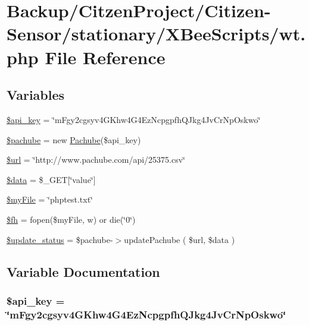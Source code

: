 \hypertarget{wt_8php}{}\section{Backup/\+Citzen\+Project/\+Citizen-\/\+Sensor/stationary/\+X\+Bee\+Scripts/wt.php File Reference}
\label{wt_8php}
\subsection*{Variables}
\begin{DoxyCompactItemize}
\item 
\hyperlink{wt_8php_a186dfe06d14a3bc248c4eb4bcdaec562}{\$api\+\_\+key} = \char`\"{}m\+Fgy2cgsyv4\+G\+Khw4\+G4\+Ez\+Ncpgpfh\+Q\+Jkg4\+Jv\+Cr\+Np\+Oskwo\char`\"{}
\item 
\hyperlink{wt_8php_a9adc98bad34c320e13c5844ae09f3898}{\$pachube} = new \hyperlink{class_pachube}{Pachube}(\$api\+\_\+key)
\item 
\hyperlink{wt_8php_acf215f34a917d014776ce684a9ee8909}{\$url} = \char`\"{}http\+://www.\+pachube.\+com/api/25375.csv\char`\"{}
\item 
\hyperlink{wt_8php_a6efc15b5a2314dd4b5aaa556a375c6d6}{\$data} = \$\+\_\+\+G\+ET\mbox{[}\char`\"{}value\char`\"{}\mbox{]}
\item 
\hyperlink{wt_8php_aec8c77a99462294dbbfb1639bd8b5165}{\$my\+File} = \char`\"{}phptest.\+txt\char`\"{}
\item 
\hyperlink{wt_8php_a015aa0bda28030cbf1a64c0afb88f958}{\$fh} = fopen(\$my\+File, \textquotesingle{}w\textquotesingle{}) or die(\char`\"{}0\char`\"{})
\item 
\hyperlink{wt_8php_ae9e1411ff46e859a40f8f1a7646430cf}{\$update\+\_\+status} = \$pachube-\/$>$update\+Pachube ( \$url, \$data )
\end{DoxyCompactItemize}


\subsection{Variable Documentation}
\subsubsection[{\texorpdfstring{\$api\+\_\+key}{$api_key}}]{\setlength{\rightskip}{0pt plus 5cm}\$api\+\_\+key = \char`\"{}m\+Fgy2cgsyv4\+G\+Khw4\+G4\+Ez\+Ncpgpfh\+Q\+Jkg4\+Jv\+Cr\+Np\+Oskwo\char`\"{}}\hypertarget{wt_8php_a186dfe06d14a3bc248c4eb4bcdaec562}{}\label{wt_8php_a186dfe06d14a3bc248c4eb4bcdaec562}


